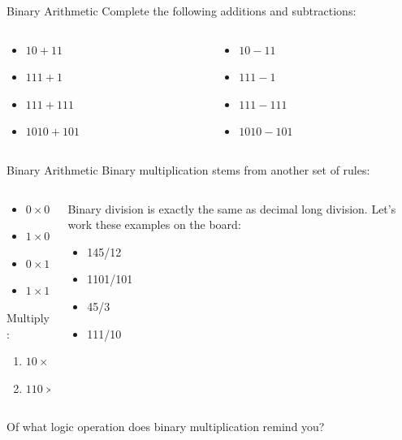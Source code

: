 \documentclass{beamer}
\begin{document}
\begin{frame}{Binary Arithmetic}
Complete the following additions and subtractions: \\ \vspace{0.5cm}
\hrulefill
\begin{columns}[T]
\begin{column}{0.5\textwidth}
\begin{itemize}
\item $10+11$
\item $111+1$
\item $111+111$
\item $1010+101$
\end{itemize}
\end{column}
\begin{column}{0.5\textwidth}
\begin{itemize}
\item $10-11$
\item $111-1$
\item $111-111$
\item $1010-101$
\end{itemize}
\end{column}
\end{columns}
\end{frame}

\begin{frame}{Binary Arithmetic}
Binary multiplication stems from another set of rules: \\ \vspace{0.5cm}
\hrulefill
\begin{columns}[T]
\begin{column}{0.5\textwidth}
\begin{itemize}
\item $0\times 0=0$
\item $1\times 0=0$
\item $0\times 1=0$
\item $1\times 1=1$
\end{itemize}
Multiply:
\begin{enumerate}
\item $10 \times 10$
\item $110 \times 10$
\end{enumerate}
\end{column}
\begin{column}{0.5\textwidth}
\small
Binary division is exactly the same as decimal long division.  Let's work these examples on the board:
\begin{itemize}
\item 145/12
\item 1101/101
\item 45/3
\item 111/10
\end{itemize}
\end{column}
\end{columns}
\small
Of what logic operation does binary multiplication remind you?
\end{frame}
\end{document}

